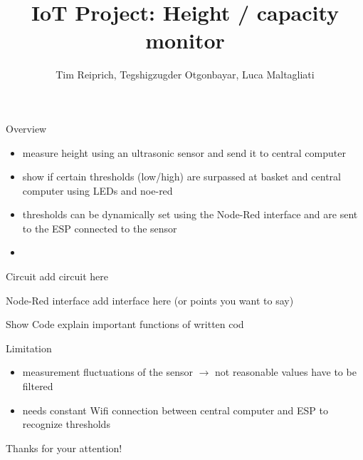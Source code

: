 \documentclass[11pt]{beamer}
\author{Tim Reiprich, Tegshigzugder Otgonbayar, Luca Maltagliati}
\title{IoT Project: Height / capacity monitor}
\begin{document}
\begin{frame}
\titlepage
\end{frame}


\begin{frame}{Overview}
\begin{itemize}
\item measure height using an ultrasonic sensor and send it to central computer
\item show if certain thresholds (low/high) are surpassed at basket and central computer using LEDs and noe-red
\item thresholds can be dynamically set using the Node-Red interface and are sent to the ESP connected to the sensor
\item
\end{itemize}
\end{frame}

\begin{frame}{Circuit}
add circuit here
\end{frame}

\begin{frame}{Node-Red interface}
add interface here (or points you want to say)
\end{frame}

\begin{frame}{Show Code}
explain important functions of written cod
\end{frame}

\begin{frame}{Limitation}
\begin{itemize}
\item measurement fluctuations of the sensor $\to$ not reasonable values have to be filtered
\item needs constant Wifi connection between central computer and ESP to recognize thresholds
\end{itemize}
\end{frame}

\begin{frame}{}
\center
\huge{Thanks for your attention!}
\end{frame}
\end{document}
